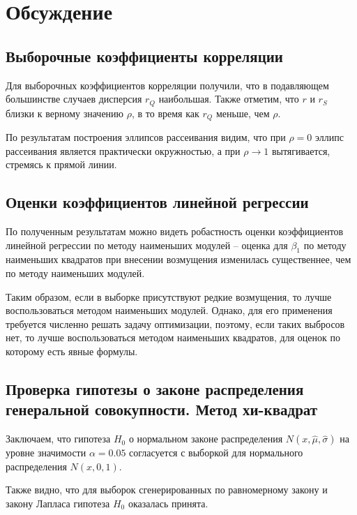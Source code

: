 \documentclass[12pt]{article}
\begin{document}
	\section{Обсуждение}
	
	\subsection{Выборочные коэффициенты корреляции}
	
	Для выборочных коэффициентов корреляции получили, что в подавляющем большинстве случаев дисперсия $r_Q$ наибольшая. Также отметим, что $r$ и $r_S$ близки к верному значению $\rho$, в то время как $r_Q$ меньше, чем $\rho$.
	
	По результатам построения эллипсов рассеивания видим, что при $\rho = 0$ эллипс рассеивания является практически окружностью, а при $\rho \rightarrow 1$ вытягивается, стремясь к прямой линии.
	
	\subsection{Оценки коэффициентов линейной регрессии}
	
	По полученным результатам можно видеть робастность оценки коэффициентов линейной регрессии по методу наименьших модулей -- оценка для $\beta_1$ по методу наименьших квадратов при внесении возмущения изменилась существеннее, чем по методу наименьших модулей.
	
	Таким образом, если в выборке присутствуют редкие возмущения, то лучше воспользоваться методом наименьших модулей. Однако, для его применения требуется численно решать задачу оптимизации, поэтому, если таких выбросов нет, то лучше воспользоваться методом наименьших квадратов, для оценок по которому есть явные формулы.
	
	\subsection{Проверка гипотезы о законе распределения генеральной совокупности. Метод хи-квадрат}
	
	Заключаем, что гипотеза $H_0$ о нормальном законе распределения $N(x, \widehat{\mu}, \widehat{\sigma})$ на уровне значимости $\alpha = 0.05$ согласуется с выборкой для нормального распределения $N(x, 0, 1)$.
	
	Также видно, что для выборок сгенерированных по равномерному закону и закону Лапласа
	гипотеза $H_0$ оказалась принята.
	
\end{document}
